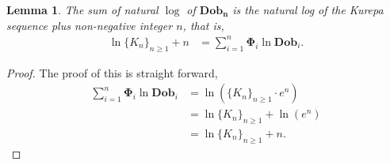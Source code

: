 \documentclass[pdflatex,sn-mathphys-num]{sn-jnl}%
\newtheorem{lemma}{Lemma}
\theoremstyle{thmstyleone}%
\theoremstyle{thmstyletwo}%
\theoremstyle{thmstylethree}%
\begin{document}
\begin{lemma}\label{lnkure}
    The sum of natural $\log$ of $\mathbf{Dob_n}$ is the natural log of the Kurepa sequence plus non-negative integer $n$, that is,
\begin{align*}
    \ln \lbrace K_n\rbrace_{n\geq 1}+ n&=\sum_{i=1}^{n}\mathbf{\Phi}_i \ln\mathbf{Dob}_i.
\end{align*}
\end{lemma}
\begin{proof}The proof of this is straight forward,
\begin{align*}
   \sum_{i=1}^{n}\mathbf{\Phi}_i \ln\mathbf{Dob}_i&= \ln (\lbrace K_n\rbrace_{n\geq 1}\cdotp e^n)\\
   &= \ln \lbrace K_n\rbrace_{n\geq 1} + \ln(e^n)\\
    &=\ln \lbrace K_n\rbrace_{n\geq 1}+ n.
\end{align*}

\end{proof}
\end{document}
